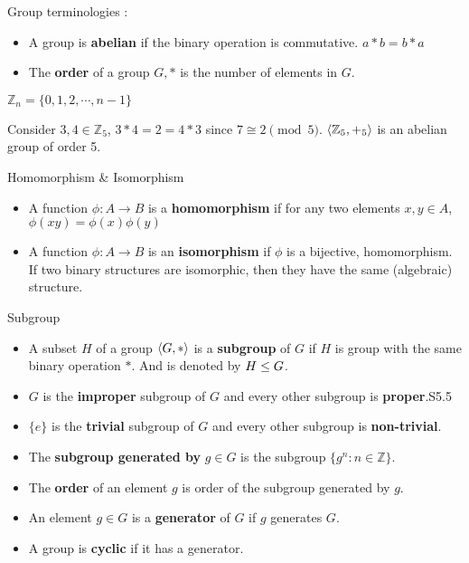 \begin{definition}Group terminologies :
\begin{itemize}
	\item A group is \textbf{abelian} if the binary operation is commutative. $a \ast b = b \ast a$%
	\item The \textbf{order} of a group $G,\ast$ is the number of elements in $G$.%
\end{itemize}
\end{definition}

\begin{definition}
	$\mathbb{Z}_n = \{ 0, 1, 2, \cdots, n-1 \}$
\end{definition}

\begin{remark}
	Consider $3,4 \in \mathbb{Z}_5$,
	$3 \ast 4 = 2 = 4 \ast 3$ since $7 \cong 2 \pmod 5$.
	$\langle \mathbb{Z}_5,+_5\rangle$ is an abelian group of order 5.
\end{remark}

\begin{definition} Homomorphism \& Isomorphism
\begin{itemize}
	\item A function $\phi : A \to B$ is a \textbf{homomorphism} if for any two elements $x,y \in A$, $\phi (xy) = \phi(x)\phi(y)$%
	\item A function $\phi : A \to B$ is an \textbf{isomorphism} if $\phi$ is a bijective, homomorphism.
	If two binary structures  are isomorphic, then they have the same (algebraic) structure.%
\end{itemize}
\end{definition}

\begin{definition} Subgroup
\begin{itemize}
	\item A subset $H$ of a group $\langle G,\ast \rangle$ is a \textbf{subgroup} of $G$ if $H$ is group with the same binary operation $\ast$.
	And is denoted by $H \le G$.%
	\item $G$ is the \textbf{improper} subgroup of $G$ and every other subgroup is \textbf{proper}.S5.5
	\item $\{e\}$ is the \textbf{trivial} subgroup of $G$ and every other subgroup is \textbf{non-trivial}.%
	\item The \textbf{subgroup generated by} $g \in G$ is the subgroup $\{ g^n : n \in \mathbb{Z} \}$.%
	\item The \textbf{order} of an element $g$ is order of the subgroup generated by $g$.%
	\item An element $g \in G$ is a \textbf{generator} of $G$ if $g$ generates $G$.%
	\item A group is \textbf{cyclic} if it has a generator.%
\end{itemize}
\end{definition}

